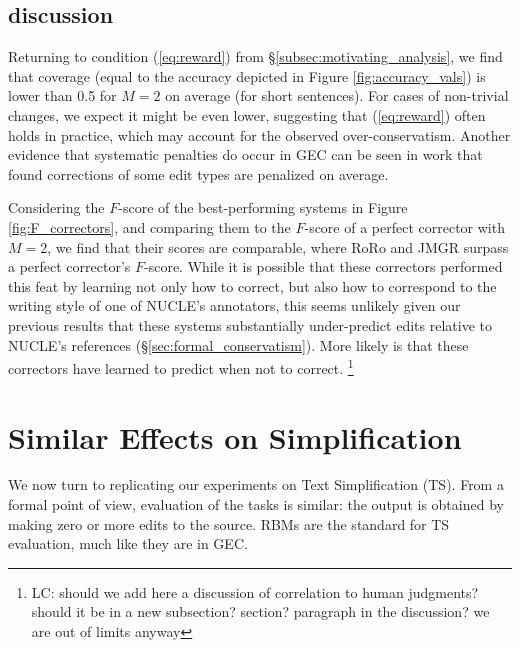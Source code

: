 \documentclass[a4paper, 11pt]{article}
\newcommand{\lc}[1]{\footnote{\color{blue}LC: #1}}
\begin{document}
\subsection{discussion}
Returning to condition (\ref{eq:reward}) from \S\ref{subsec:motivating_analysis}, we find that coverage (equal to the accuracy depicted in Figure \ref{fig:accuracy_vals}) is lower than 0.5 for $M=2$ on average (for short sentences). For cases of non-trivial changes, we expect it might be even lower, suggesting that (\ref{eq:reward}) often holds in practice, which may account for the observed over-conservatism. Another evidence that systematic penalties do occur in GEC can be seen in \citet{our corpus} work that found corrections of some edit types are penalized on average.

Considering the $F$-score of the best-performing systems in Figure \ref{fig:F_correctors}, and comparing them to the $F$-score of a perfect corrector with $M=2$, we find that their scores are comparable, where RoRo and JMGR surpass a perfect corrector's $F$-score.
While it is possible that these correctors performed this feat by learning not only how to correct, but also how to correspond to the writing style of one of NUCLE's annotators, this seems unlikely given our previous results that these systems substantially under-predict edits relative to NUCLE's references (\S\ref{sec:formal_conservatism}). 
More likely is that these correctors have learned to predict when not to correct.
\lc{should we add here a discussion of correlation to human judgments? should it be in a new subsection? section? paragraph in the discussion? we are out of limits anyway}
%
%

\vspace{-.1cm}
\section{Similar Effects on Simplification}\label{sec:simplification}
\vspace{-.1cm}

We now turn to replicating our experiments on Text Simplification (TS). From a formal point of view, evaluation of the tasks is similar:
the output is obtained by making zero or more edits to the source. RBMs are the standard for TS evaluation,
much like they are in GEC.
\end{document}

